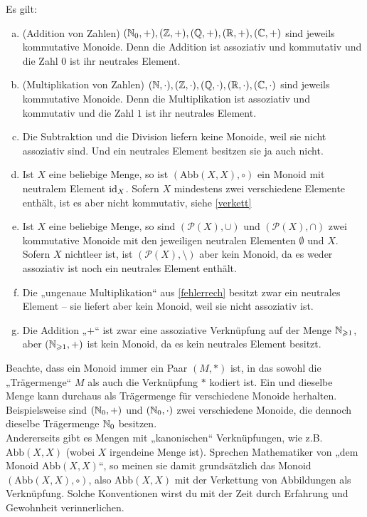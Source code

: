 \begin{bsp} Es gilt:
\begin{enumerate}[a)]
 \item(Addition von Zahlen) $({\mathbb N}_0,+),({\mathbb Z},+),({\mathbb Q},+),({\mathbb R},+),({\mathbb C},+)$ sind jeweils kommutative Monoide. Denn die Addition ist assoziativ und kommutativ und die Zahl $0$ ist ihr neutrales Element.
 \item(Multiplikation von Zahlen) $({\mathbb N},\cdot),({\mathbb Z},\cdot),({\mathbb Q},\cdot),({\mathbb R},\cdot),({\mathbb C},\cdot)$ sind jeweils kommutative Monoide. Denn die Multiplikation ist assoziativ und kommutativ und die Zahl $1$ ist ihr neutrales Element.
 \item Die Subtraktion und die Division liefern keine Monoide, weil sie nicht assoziativ sind. Und ein neutrales Element besitzen sie ja auch nicht.
 \item Ist $X$ eine beliebige Menge, so ist $(\text{Abb}(X,X),\circ)$ ein Monoid mit neutralem Element $\operatorname{id}_X$. Sofern $X$ mindestens zwei verschiedene Elemente enthält, ist es aber nicht kommutativ, siehe \cref{verkett}
 \item Ist $X$ eine beliebige Menge, so sind $(\mathcal{P}(X),\cup)$ und $(\mathcal{P}(X),\cap)$ zwei kommutative Monoide mit den jeweiligen neutralen Elementen $\emptyset$ und $X$. Sofern $X$ nichtleer ist, ist $(\mathcal{P}(X),\setminus)$ aber kein Monoid, da es weder assoziativ ist noch ein neutrales Element enthält.
 \item Die „ungenaue Multiplikation“ aus \cref{fehlerrech} besitzt zwar ein neutrales Element -- sie liefert aber kein Monoid, weil sie nicht assoziativ ist.
 \item Die Addition „$+$“ ist zwar eine assoziative Verknüpfung auf der Menge ${\mathbb N}_{\geqslant 1}$, aber $({\mathbb N}_{\geqslant 1},+)$ ist kein Monoid, da es kein neutrales Element besitzt.
\end{enumerate}
\end{bsp}





\begin{bem}[Trägermenge]
 Beachte, dass ein Monoid immer ein Paar $(M,*)$ ist, in das sowohl die „Trägermenge“ $M$ als auch die Verknüpfung $*$ kodiert ist. Ein und dieselbe Menge kann durchaus als Trägermenge für verschiedene Monoide herhalten. Beispielsweise sind $({\mathbb N}_0,+)$ und $({\mathbb N}_0,\cdot)$ zwei verschiedene Monoide, die dennoch dieselbe Trägermenge ${\mathbb N}_0$ besitzen. \\
 Andererseits gibt es Mengen mit „kanonischen“ Verknüpfungen, wie z.B. $\text{Abb}(X,X)$ (wobei $X$ irgendeine Menge ist). Sprechen Mathematiker von „dem Monoid $\text{Abb}(X,X)$“, so meinen sie damit grundsätzlich das Monoid $(\text{Abb}(X,X),\circ)$, also $\text{Abb}(X,X)$ mit der Verkettung von Abbildungen als Verknüpfung. Solche Konventionen wirst du mit der Zeit durch Erfahrung und Gewohnheit verinnerlichen.
\end{bem}





